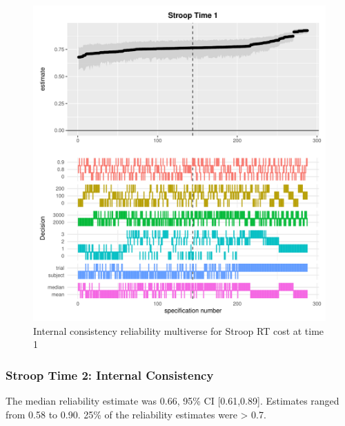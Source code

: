 \documentclass[
  english,
  man,floatsintext]{apa6}
\begin{document}
\begin{figure}
\centering
\includegraphics{Reliability_Multiverse_files/figure-latex/unnamed-chunk-5-1.pdf}
\caption{\label{fig:unnamed-chunk-5}Internal consistency reliability multiverse for Stroop RT cost at time 1}
\end{figure}

\newpage

\hypertarget{stroop-time-2-internal-consistency}{%
\subsubsection{Stroop Time 2: Internal Consistency}\label{stroop-time-2-internal-consistency}}

The median reliability estimate was 0.66, 95\% CI {[}0.61,0.89{]}. Estimates ranged from 0.58 to 0.90. 25\% of the reliability estimates were \textgreater{} 0.7.
\end{document}
